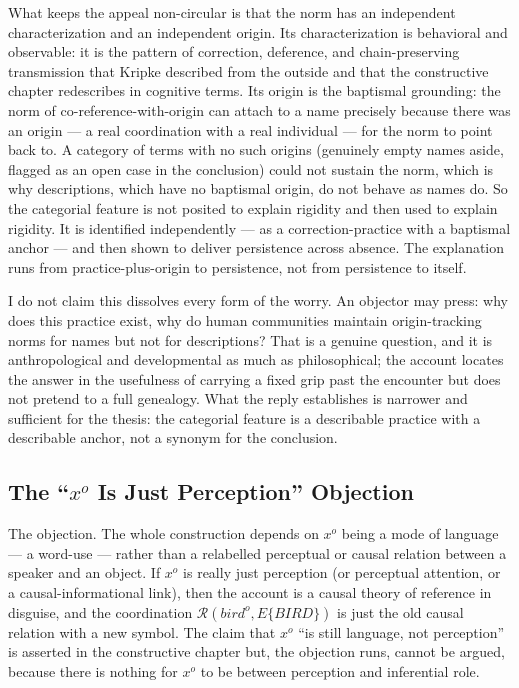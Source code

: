 \documentclass[12pt,a4paper]{article}
\begin{document}
What keeps the appeal non-circular is that the norm has an independent characterization and an independent origin. Its characterization is behavioral and observable: it is the pattern of correction, deference, and chain-preserving transmission that Kripke described from the outside and that the constructive chapter redescribes in cognitive terms. Its origin is the baptismal grounding: the norm of co-reference-with-origin can attach to a name precisely because there was an origin --- a real coordination with a real individual --- for the norm to point back to. A category of terms with no such origins (genuinely empty names aside, flagged as an open case in the conclusion) could not sustain the norm, which is why descriptions, which have no baptismal origin, do not behave as names do. So the categorial feature is not posited to explain rigidity and then used to explain rigidity. It is identified independently --- as a correction-practice with a baptismal anchor --- and then shown to deliver persistence across absence. The explanation runs from practice-plus-origin to persistence, not from persistence to itself.

I do not claim this dissolves every form of the worry. An objector may press: why does this practice exist, why do human communities maintain origin-tracking norms for names but not for descriptions? That is a genuine question, and it is anthropological and developmental as much as philosophical; the account locates the answer in the usefulness of carrying a fixed grip past the encounter but does not pretend to a full genealogy. What the reply establishes is narrower and sufficient for the thesis: the categorial feature is a describable practice with a describable anchor, not a synonym for the conclusion.

\subsection{\texorpdfstring{The ``\(x^o\) Is Just Perception'' Objection}{The ``x\^{}o Is Just Perception'' Objection}}\label{the-xo-is-just-perception-objection}

The objection. The whole construction depends on \(x^o\) being a mode of language --- a word-use --- rather than a relabelled perceptual or causal relation between a speaker and an object. If \(x^o\) is really just perception (or perceptual attention, or a causal-informational link), then the account is a causal theory of reference in disguise, and the coordination \(\mathcal{R}(bird^o, E\{BIRD\})\) is just the old causal relation with a new symbol. The claim that \(x^o\) ``is still language, not perception'' is asserted in the constructive chapter but, the objection runs, cannot be argued, because there is nothing for \(x^o\) to be between perception and inferential role.
\end{document}
